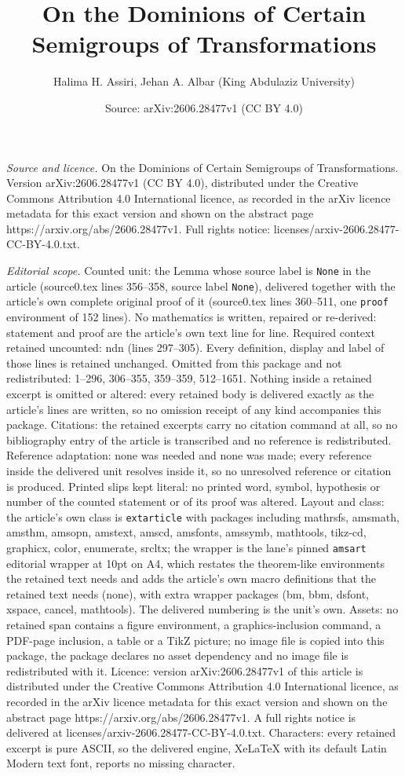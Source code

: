 \documentclass[10pt,a4paper]{amsart}
\title[On the Dominions of Certain Semigroups of Transformations]{On the Dominions of Certain Semigroups of Transformations}
\author{Halima H. Assiri, Jehan A. Albar (King Abdulaziz University)}
\date{Source: arXiv:2606.28477v1 (CC BY 4.0)}
\begin{document}
\maketitle

\noindent\emph{Source and licence.} On the Dominions of Certain Semigroups of Transformations. Version arXiv:2606.28477v1 (CC BY 4.0), distributed under the Creative Commons Attribution 4.0 International licence, as recorded in the arXiv licence metadata for this exact version and shown on the abstract page https://arxiv.org/abs/2606.28477v1. Full rights notice: licenses/arxiv-2606.28477-CC-BY-4.0.txt.\par\smallskip

\noindent\textit{Editorial scope.} Counted unit: the Lemma whose source label is \texttt{None} in the article (source0.tex lines 356--358, source label \texttt{None}), delivered together with the article's own complete original proof of it (source0.tex lines 360--511, one \texttt{proof} environment of 152 lines). No mathematics is written, repaired or re-derived: statement and proof are the article's own text line for line. Required context retained uncounted: ndn (lines 297--305). Every definition, display and label of those lines is retained unchanged. Omitted from this package and not redistributed: 1--296, 306--355, 359--359, 512--1651. Nothing inside a retained excerpt is omitted or altered: every retained body is delivered exactly as the article's lines are written, so no omission receipt of any kind accompanies this package. Citations: the retained excerpts carry no citation command at all, so no bibliography entry of the article is transcribed and no reference is redistributed. Reference adaptation: none was needed and none was made; every reference inside the delivered unit resolves inside it, so no unresolved reference or citation is produced. Printed slips kept literal: no printed word, symbol, hypothesis or number of the counted statement or of its proof was altered. Layout and class: the article's own class is \texttt{extarticle} with packages including mathrsfs, amsmath, amsthm, amsopn, amstext, amscd, amsfonts, amssymb, mathtools, tikz-cd, graphicx, color, enumerate, srcltx; the wrapper is the lane's pinned \texttt{amsart} editorial wrapper at 10pt on A4, which restates the theorem-like environments the retained text needs and adds the article's own macro definitions that the retained text needs (none), with extra wrapper packages (bm, bbm, dsfont, xspace, cancel, mathtools). The delivered numbering is the unit's own. Assets: no retained span contains a figure environment, a graphics-inclusion command, a PDF-page inclusion, a table or a TikZ picture; no image file is copied into this package, the package declares no asset dependency and no image file is redistributed with it. Licence: version arXiv:2606.28477v1 of this article is distributed under the Creative Commons Attribution 4.0 International licence, as recorded in the arXiv licence metadata for this exact version and shown on the abstract page https://arxiv.org/abs/2606.28477v1. A full rights notice is delivered at licenses/arxiv-2606.28477-CC-BY-4.0.txt. Characters: every retained excerpt is pure ASCII, so the delivered engine, XeLaTeX with its default Latin Modern text font, reports no missing character.
\end{document}
